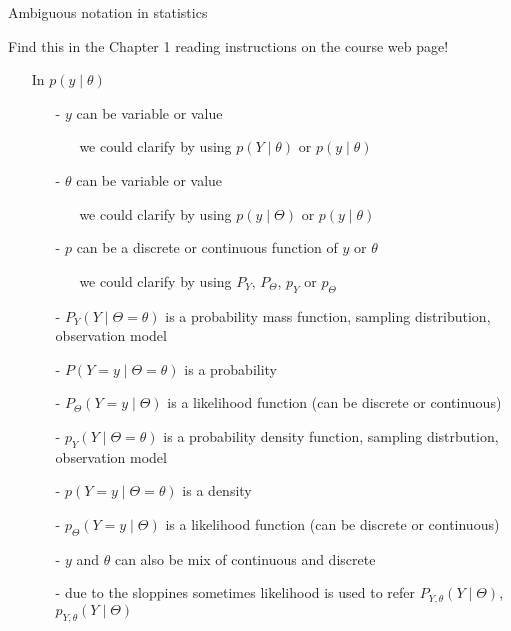 \documentclass[english,t]{beamer}
\begin{document}
\begin{frame}{Ambiguous notation in statistics}

  \vspace{-\baselineskip}
  {\small Find this in the Chapter 1 reading instructions on the course web page!}
  
  \begin{itemize}
  \item[] In $p(y \mid \theta)$
  \begin{itemize}
  \item[-] $y$ can be variable or value
    \begin{itemize}
    \item[] we could clarify by using $p(Y \mid \theta)$ or $p(y \mid \theta)$
    \end{itemize}
  \item[-] $\theta$ can be variable or value
    \begin{itemize}
    \item[] we could clarify by using $p(y \mid \Theta)$ or $p(y \mid \theta)$
    \end{itemize}
  \item[-] $p$ can be a discrete or continuous function of $y$ or $\theta$
    \begin{itemize}
    \item[] we could clarify by using $P_Y$, $P_\Theta$, $p_Y$ or $p_\Theta$
    \end{itemize}
\item[-]
  $P_Y(Y \mid \Theta=\theta)$ is a probability mass function, sampling distribution, observation model
\item[-]
$P(Y=y \mid \Theta=\theta)$ is a probability
\item[-]
$P_\Theta(Y=y \mid \Theta)$ is a likelihood function (can be discrete or continuous)
\item[-] $p_Y(Y \mid \Theta=\theta)$ is a probability density function, sampling distrbution, observation model
\item[-] $p(Y=y \mid \Theta=\theta)$ is a density
\item[-] $p_\Theta(Y=y \mid \Theta)$ is a likelihood function (can be discrete or continuous)
  \item[-] $y$ and $\theta$ can also be mix of continuous and discrete
    \item[-] due to the sloppines sometimes likelihood is used to refer
$P_{Y,\theta}(Y \mid \Theta)$, $p_{Y,\theta}(Y \mid \Theta)$

  \end{itemize}
\end{itemize}
\end{frame}
\end{document}
